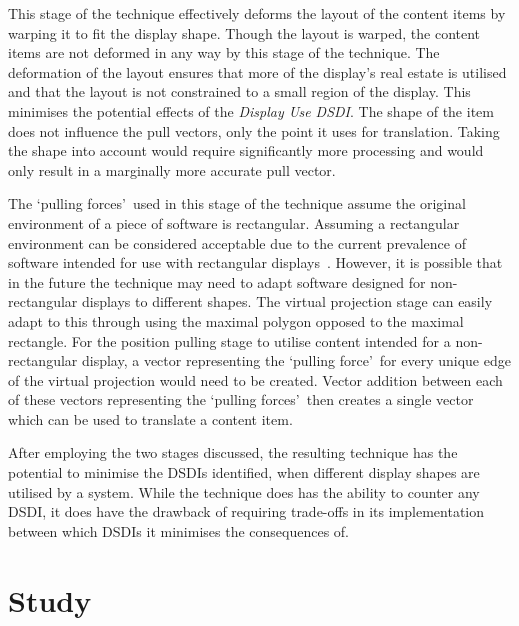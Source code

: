 \documentclass[review,5p,times,twocolumn]{elsarticle}
\begin{document}
This stage of the technique effectively deforms the layout of the content items by warping it to fit the display shape.
Though the layout is warped, the content items are not deformed in any way by this stage of the technique.
The deformation of the layout ensures that more of the display's real estate is utilised and that the layout is not constrained to a small region of the display.
This minimises the potential effects of the {\emph{Display Use \ac{DSDI}}}.
The shape of the item does not influence the pull vectors, only the point it uses for translation.
Taking the shape into account would require significantly more processing and would only result in a marginally more accurate pull vector.

The \lq pulling forces\rq\ used in this stage of the technique assume the original environment of a piece of software is rectangular.
Assuming a rectangular environment can be considered acceptable due to the current prevalence of software intended for use with rectangular displays~\cite{VanDam2001}.
However, it is possible that in the future the technique may need to adapt software designed for non-rectangular displays to different shapes.
The virtual projection stage can easily adapt to this through using the maximal polygon opposed to the maximal rectangle.
For the position pulling stage to utilise content intended for a non-rectangular display, a vector representing the \lq pulling force\rq\ for every unique edge of the virtual projection would need to be created.
Vector addition between each of these vectors representing the \lq pulling forces\rq\ then creates a single vector which can be used to translate a content item.

After employing the two stages discussed, the resulting technique has the potential to minimise the \acp{DSDI} identified, when different display shapes are utilised by a system. 
While the technique does has the ability to counter any \ac{DSDI}, it does have the drawback of requiring trade-offs in its implementation between which \acp{DSDI} it minimises the consequences of.

\section{Study}
\label{sec:study}
\end{document}
